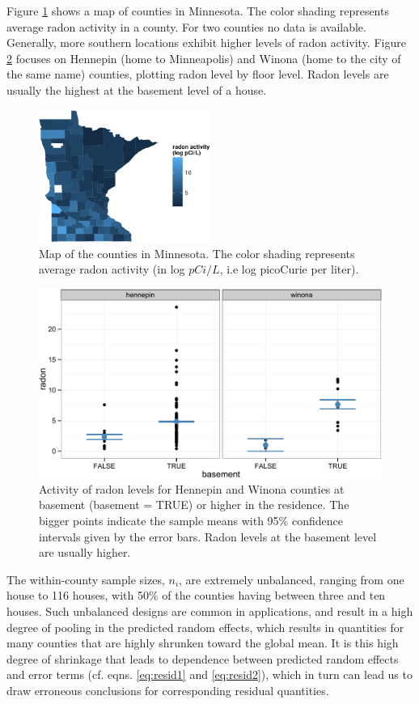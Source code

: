 \documentclass[12pt]{article} %
\begin{document}
Figure \ref{fig:map} shows a map of counties in Minnesota. The color shading represents average radon activity in a county. For two counties no data is available. Generally, more southern locations exhibit higher  levels of radon activity. Figure \ref{fig:tc} focuses on Hennepin (home to Minneapolis) and Winona (home to the city of the same name) counties, plotting radon level by floor level. Radon levels are usually the highest at the basement level of a house. 
%
\begin{figure}[htb]
\centering
\includegraphics[width=0.5\textwidth]{figures/map.pdf}
\caption{\label{fig:map} Map of the counties in Minnesota. The color shading represents average radon activity (in log $pCi/L$, i.e log picoCurie per liter).}
\end{figure}
%
\begin{figure}[htb]
\centering
\includegraphics[width=0.7\linewidth]{figures/radon-twocounties.pdf}
\caption{\label{fig:tc} Activity of radon levels for Hennepin and Winona counties at basement (basement = TRUE) or higher in the residence. The bigger points indicate the sample means with 95\% confidence intervals  given by the error bars. Radon levels at the basement level are usually higher.}
\end{figure}
%
The within-county sample sizes, $n_i$, are extremely unbalanced, ranging from one house to 116 houses, with 50\% of the counties having between three and ten houses. Such unbalanced designs are common in applications, and result in a high degree of pooling in the predicted random effects, which results in quantities for many counties that are highly shrunken toward the global mean. It is this high degree of shrinkage that leads to dependence between  predicted random effects and error terms (cf. eqns. \ref{eq:resid1} and \ref{eq:resid2}), which in turn can lead us to draw erroneous conclusions for corresponding residual quantities.
\end{document}
